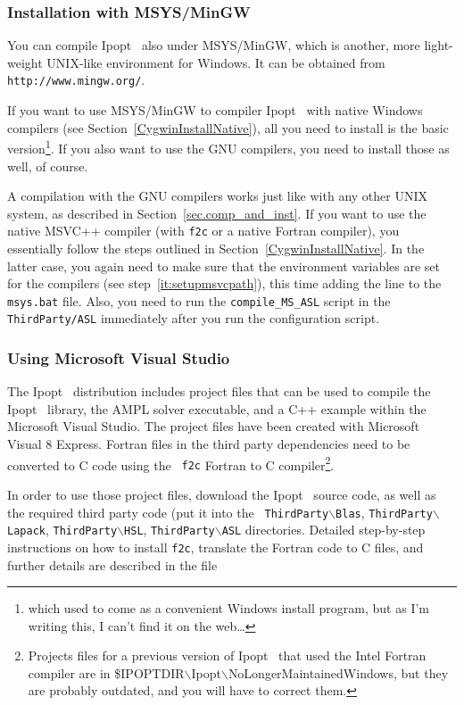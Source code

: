 \documentclass[10pt]{article}
\newcommand{\Ipopt}{{\sc Ipopt }}
\begin{document}
\subsubsection{Installation with MSYS/MinGW}\label{MinGWInstall}

You can compile \Ipopt\ also under MSYS/MinGW, which is another, more
light-weight UNIX-like environment for Windows.  It can be obtained
from \texttt{http://www.mingw.org/}.

If you want to use MSYS/MinGW to compiler \Ipopt\ with native Windows
compilers (see Section~\ref{CygwinInstallNative}), all you need to
install is the basic version\footnote{which used to come as a
  convenient Windows install program, but as I'm writing this, I can't
  find it on the web\ldots}.  If you also want to use the GNU
compilers, you need to install those as well, of course.

A compilation with the GNU compilers works just like with any other
UNIX system, as described in Section~\ref{sec.comp_and_inst}.  If you
want to use the native MSVC++ compiler (with {\tt f2c} or a native
Fortran compiler), you essentially follow the steps outlined in
Section~\ref{CygwinInstallNative}.  In the latter case, you again need
to make sure that the environment variables are set for the compilers
(see step~\ref{it:setupmsvcpath}), this time adding the line to the
{\tt msys.bat} file.  Also, you need to run the
\texttt{compile\_MS\_ASL} script in the \texttt{ThirdParty/ASL}
immediately after you run the configuration script.

\subsubsection{Using Microsoft Visual Studio}\label{VisualStudioInstall}

The \Ipopt\ distribution includes project files that can be used to
compile the \Ipopt\ library, the AMPL solver executable, and a C++
example within the Microsoft Visual Studio.  The project files have
been created with Microsoft Visual 8 Express.  Fortran files in the
third party dependencies need to be converted to C code using the {\tt
  f2c} Fortran to C compiler\footnote{Projects files for a previous
  version of \Ipopt\ that used the Intel Fortran compiler are in
  {\$IPOPTDIR$\backslash$Ipopt$\backslash$NoLongerMaintainedWindows},
  but they are probably outdated, and you will have to correct them.}.

In order to use those project files, download the \Ipopt\ source code,
as well as the required third party code (put it into the {\tt
  ThirdParty$\backslash$Blas}, {\tt ThirdParty$\backslash$Lapack},
{\tt ThirdParty$\backslash$HSL}, {\tt  ThirdParty$\backslash$ASL}
directories.  Detailed step-by-step instructions on how to install
{\tt f2c}, translate the Fortran code to C files, and further details
are described in the file
\end{document}
